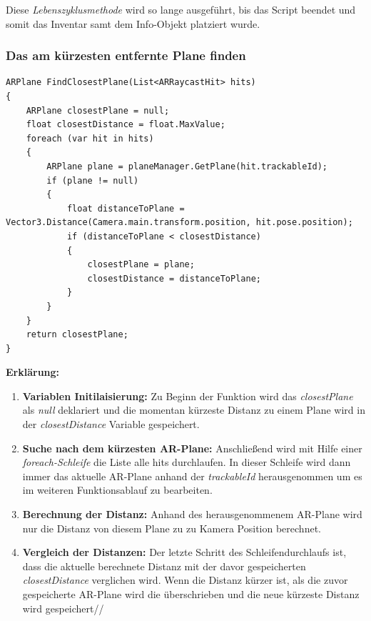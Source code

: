 Diese \textit{Lebenszyklusmethode} wird so lange ausgeführt, bis das Script beendet und somit das Inventar samt dem Info-Objekt
platziert wurde.

\subsubsection{Das am kürzesten entfernte Plane finden}
\begin{lstlisting}[style=csharp, caption={}, label=code:findclosestplane]
ARPlane FindClosestPlane(List<ARRaycastHit> hits)
{
    ARPlane closestPlane = null;
    float closestDistance = float.MaxValue;
    foreach (var hit in hits)
    {
        ARPlane plane = planeManager.GetPlane(hit.trackableId);
        if (plane != null)
        {
            float distanceToPlane = Vector3.Distance(Camera.main.transform.position, hit.pose.position);
            if (distanceToPlane < closestDistance)
            {
                closestPlane = plane;
                closestDistance = distanceToPlane;
            }
        }
    }
    return closestPlane;
}
\end{lstlisting}

\textbf{Erklärung:}
\begin{enumerate}
    \item \textbf{Variablen Initilaisierung: }Zu Beginn der Funktion wird das \textit{closestPlane} als \textit{null}
    deklariert und die momentan kürzeste Distanz zu einem Plane wird in der \textit{closestDistance} Variable gespeichert.
    \item \textbf{Suche nach dem kürzesten AR-Plane:} Anschließend wird mit Hilfe einer \textit{foreach-Schleife} die
    Liste alle hits durchlaufen. In dieser Schleife wird dann immer das aktuelle AR-Plane anhand der \textit{trackableId}
    herausgenommen um es im weiteren Funktionsablauf zu bearbeiten.
    \item \textbf{Berechnung der Distanz:} Anhand des herausgenommenem AR-Plane wird nur die Distanz von diesem Plane zu
    zu Kamera Position berechnet.
    \item \textbf{Vergleich der Distanzen:} Der letzte Schritt des Schleifendurchlaufs ist, dass die aktuelle berechnete
    Distanz mit der davor gespeicherten \textit{closestDistance} verglichen wird. Wenn die Distanz kürzer ist, als die
    zuvor gespeicherte AR-Plane wird die  überschrieben und die neue kürzeste Distanz wird gespeichert//
\end{enumerate}

